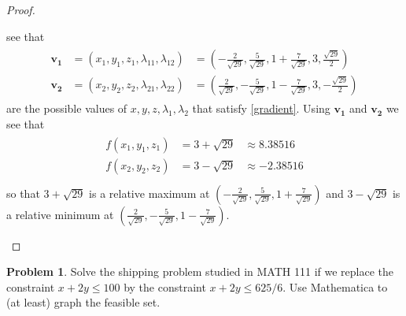 \documentclass[12pt]{article}
\theoremstyle{definition}
\newtheorem{problem}{Problem}
\newcommand{\vect}[1]{\boldsymbol{#1}}
\begin{document}
\begin{proof}
\begin{enumerate}
      see that
      \begin{align}
        \begin{array}{lll}
          \vect{v_1} &= (x_1, y_1, z_1, \lambda_{11}, \lambda_{12}) &=\left( -\frac{2}{\sqrt{29}}, \frac{5}{\sqrt{29}}, 1 + \frac{7}{\sqrt{29}}, 3, \frac{\sqrt{29}}{2} \right)\\
          \vect{v_2} &= (x_2, y_2, z_2, \lambda_{21}, \lambda_{22}) &=  \left( \frac{2}{\sqrt{29}}, -\frac{5}{\sqrt{29}}, 1 - \frac{7}{\sqrt{29}}, 3, -\frac{\sqrt{29}}{2} \right)
        \end{array}
      \end{align}
      are the possible values of $x, y, z, \lambda_1, \lambda_2$ that satisfy \eqref{gradient}.
      Using $\vect{v_1}$ and $\vect{v_2}$ we see that
      \begin{align*}
        \begin{array}{lll}
          f(x_1, y_1, z_1) &= 3 + \sqrt{29}  &\approx 8.38516\\
          f(x_2, y_2, z_2) &= 3 - \sqrt{29} &\approx -2.38516\\
        \end{array}
      \end{align*}
      so that $3 + \sqrt{29} $ is a relative maximum at $\left( -\frac{2}{\sqrt{29}}, \frac{5}{\sqrt{29}}, 1 + \frac{7}{\sqrt{29}}\right)$ and
      $3 - \sqrt{29}$ is a relative minimum at $\left( \frac{2}{\sqrt{29}}, -\frac{5}{\sqrt{29}}, 1 - \frac{7}{\sqrt{29}}\right)$.
  \end{enumerate}
\end{proof}
\newpage


\begin{problem}
  Solve the shipping problem studied in MATH 111 if we replace the constraint
  $x + 2y \leq 100$ by the constraint $x + 2y \leq 625/6$. Use Mathematica to
  (at least) graph the feasible set.
\end{problem}
\end{document}

